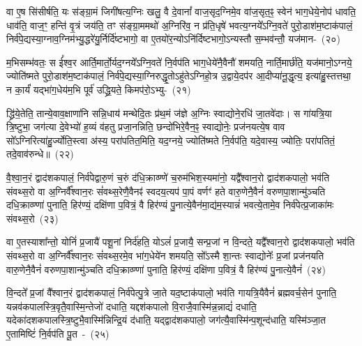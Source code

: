 वा ए॒ष सि॑सीर्\mbox{}षति॒ यः स॑ङ्ग्रा॒मं जिगी॑षत्य॒ग्निः खलु॒ वै दे॒वानां᳚ वाज॒सृद॒ग्निमे॒व वा॑ज॒सृत॒ꣴ॒ स्वेन॑ भाग॒धेये॒नोप॑ धावति॒ धाव॑ति॒ वाज॒ꣳ॒ हन्ति॑ वृ॒त्रं जय॑ति॒ तꣳ स॑ङ्ग्रा॒ममथो॑ अ॒ग्निरि॑व॒ न प्र॑ति॒धृषे॑ भवत्य॒ग्नये᳚\-ऽग्नि॒वते॑ पुरो॒डाश॑\-म॒ष्टा\-क॑पालं॒ निर्व॑पे॒द्यस्या॒ग्नाव॒ग्निम॑भ्यु॒द्धरे॑यु॒र्निर्दि॑ष्टभागो॒ वा ए॒तयो॑र॒न्यो\-ऽनि॑र्दिष्टभागो॒\-ऽन्यस्तौ स॒म्भव॑न्तौ॒ यज॑मान-~(२०)

म॒भिसम्भ॑वतः॒ स ई᳚श्व॒र आर्ति॒मार्तो॒र्यद॒ग्नये᳚\-ऽग्नि॒वते॑ नि॒र्वप॑ति भाग॒धेये॑नै॒वैनौ॑ शमयति॒ नार्ति॒मार्छ॑ति॒ यज॑मानो॒\-ऽग्नये॒ ज्योति॑ष्मते पुरो॒डाश॑\-म॒ष्टा\-क॑पालं॒ निर्व॑पे॒द्यस्या॒ग्निरुद्धृ॒तो\-ऽहु॑ते\-ऽग्निहो॒त्र उ॒द्वाये॒दप॑र आ॒दीप्या॑नू॒द्धृत्य॒ इत्या॑हु॒स्तत्तथा॒ न का॒र्यं॑ यद्भा॑ग॒धेय॑म॒भि पूर्व॑ उद्ध्रि॒यते॒ किमप॑रो॒\-ऽभ्यु-~(२१)

द्ध्रि॑ये॒तेति॒ तान्ये॒वाव॒क्षाणा॑नि सन्नि॒धाय॑ मन्थेदि॒तः प्र॑थ॒मं ज॑ज्ञे अ॒ग्निः स्वाद्योने॒रधि॑ जा॒तवे॑दाः। स गा॑यत्रि॒या त्रि॒ष्टुभा॒ जग॑त्या दे॒वेभ्यो॑ ह॒व्यं व॑हतु प्रजा॒नन्निति॒ छन्दो॑भिरे॒वैन॒ꣴ॒ स्वाद्योनेः॒ प्रज॑नयत्ये॒ष वाव सो᳚\-ऽग्निरित्या॑हु॒र्ज्योति॒स्त्वा अ॑स्य॒ परा॑पतित॒मिति॒ यद॒ग्नये॒ ज्योति॑ष्मते नि॒र्वप॑ति॒ यदे॒वास्य॒ ज्योतिः॒ परा॑पतितं॒ तदे॒\-वाव॑\-रुन्धे॥~(२२)

{\anuvakamend[{क॒रो॒त्य॒न्ना॒दो द॑धाति॒ यद॒ग्नये॒ शुच॑ये॒ चक्षु॑रे॒वास्मि॒न्तेन॑ दधाति करोति॒ वाजं॒ यज॑मान॒मुदे॒वास्य॒ षट्च॑}]}%

वै॒श्वा॒न॒रं द्वाद॑श\-कपालं॒ निर्व॑पेद्वारु॒णं च॒रुं द॑धि॒क्राव्ण्णे॑ च॒रुम॑भिश॒स्यमा॑नो॒ यद्वै᳚श्वान॒रो द्वाद॑श\-कपालो॒ भव॑ति संवथ्स॒रो वा अ॒ग्निर्वै᳚श्वान॒रः सं॑वथ्स॒रेणै॒वैनꣴ॑ स्वदय॒त्यप॑ पा॒पं वर्णꣳ॑ हते वारु॒णेनै॒वैनं॑ वरुणपा॒शान्मु॑ञ्चति दधि॒क्राव्ण्णा॑ पुनाति॒ हिर॑ण्यं॒ दक्षि॑णा प॒वित्रं॒ वै हिर॑ण्यं पु॒नात्ये॒वैन॑मा॒द्य॑म॒स्यान्नं॑ भवत्ये॒तामे॒व निर्व॑पेत्प्र॒जाका॑मः संवथ्स॒रो~(२३)

वा ए॒तस्याशा᳚न्तो॒ योनिं॑ प्र॒जायै॑ पशू॒नां निर्द॑हति॒ यो\-ऽलं॑ प्र॒जायै॒ सन्प्र॒जां न वि॒न्दते॒ यद्वै᳚श्वान॒रो द्वाद॑श\-कपालो॒ भव॑ति संवथ्स॒रो वा अ॒ग्निर्वै᳚श्वान॒रः सं॑वथ्स॒रमे॒व भा॑ग॒धेये॑न शमयति॒ सो᳚\-ऽस्मै शा॒न्तः स्वाद्योनेः᳚ प्र॒जां प्रज॑नयति वारु॒णेनै॒वैनं॑ वरुणपा॒शान्मु॑ञ्चति दधि॒क्राव्ण्णा॑ पुनाति॒ हिर॑ण्यं॒ दक्षि॑णा प॒वित्रं॒ वै हिर॑ण्यं पु॒नात्ये॒वैनं॑~(२४)

वि॒न्दते᳚ प्र॒जां वै᳚श्वान॒रं द्वाद॑श\-कपालं॒ निर्व॑पेत्पु॒त्रे जा॒ते यद॒ष्टाक॑पालो॒ भव॑ति गायत्रि॒यैवैनं॑ ब्रह्मवर्च॒सेन॑ पुनाति॒ यन्नव॑कपालस्त्रि॒वृतै॒वास्मि॒न्तेजो॑ दधाति॒ यद्दश॑\-कपालो वि॒राजै॒वास्मि॑न्न॒न्नाद्यं॑ दधाति॒ यदेका॑\-दश\-कपालस्त्रि॒ष्टुभै॒वा\-स्मि॑न्निन्द्रि॒यं द॑धाति॒ यद्द्वाद॑श\-कपालो॒ जग॑त्यै॒वास्मि॑न्प॒शून्द॑\-धाति॒ यस्मि॑ञ्जा॒त ए॒तामिष्टिं॑ नि॒र्वप॑ति पू॒त~-~(२५)

